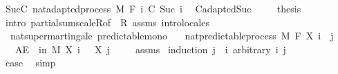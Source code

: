 \begin{isabellebody}
\ Suc{\isacharunderscore}{\kern0pt}C{\isacharcolon}{\kern0pt}\ nat{\isacharunderscore}{\kern0pt}adapted{\isacharunderscore}{\kern0pt}process\ M\ F\ {\isachardoublequoteopen}{\isasymlambda}i{\isachardot}{\kern0pt}\ C\ {\isacharparenleft}{\kern0pt}Suc\ i{\isacharparenright}{\kern0pt}{\isachardoublequoteclose}\ \isamarkupfalse%
\ C{\isachardot}{\kern0pt}adapted{\isacharunderscore}{\kern0pt}Suc\ \isacommand{{\isachardot}{\kern0pt}}\isamarkupfalse%
\isanewline
\ \ \isamarkupfalse%
\ {\isacharquery}{\kern0pt}thesis\ \isamarkupfalse%
\ {\isacharparenleft}{\kern0pt}intro\ partial{\isacharunderscore}{\kern0pt}sum{\isacharunderscore}{\kern0pt}scaleR{\isacharbrackleft}{\kern0pt}of\ {\isacharunderscore}{\kern0pt}\ R{\isacharbrackright}{\kern0pt}\ assms{\isacharparenright}{\kern0pt}\ {\isacharparenleft}{\kern0pt}intro{\isacharunderscore}{\kern0pt}locales{\isacharparenright}{\kern0pt}\isanewline
{}\isamarkupfalse%
%
\endisatagproof
{\isafoldproof}%
%
\isadelimproof
%
\endisadelimproof
%
\isadelimdocument
%
\endisadelimdocument
%
\isatagdocument
%
\isamarkuptrue%
%
\endisatagdocument
{\isafolddocument}%
%
\isadelimdocument
%
\endisadelimdocument
{}\isamarkupfalse%
\ {\isacharparenleft}{\kern0pt}\ nat{\isacharunderscore}{\kern0pt}supermartingale{\isacharparenright}{\kern0pt}\ predictable{\isacharunderscore}{\kern0pt}mono{\isacharcolon}{\kern0pt}\isanewline
\ \ \ {\isachardoublequoteopen}nat{\isacharunderscore}{\kern0pt}predictable{\isacharunderscore}{\kern0pt}process\ M\ F\ X{\isachardoublequoteclose}\ {\isachardoublequoteopen}i\ {\isasymle}\ j{\isachardoublequoteclose}\isanewline
\ \ \ {\isachardoublequoteopen}AE\ {\isasymxi}\ in\ M{\isachardot}{\kern0pt}\ X\ i\ {\isasymxi}\ {\isasymge}\ X\ j\ {\isasymxi}{\isachardoublequoteclose}\isanewline
%
\isadelimproof
\ \ %
\endisadelimproof
%
\isatagproof
{}\isamarkupfalse%
\ assms{\isacharparenleft}{\kern0pt}{}{\isacharparenright}{\kern0pt}\isanewline
{}\isamarkupfalse%
\ {\isacharparenleft}{\kern0pt}induction\ {\isachardoublequoteopen}j\ {\isacharminus}{\kern0pt}\ i{\isachardoublequoteclose}\ arbitrary{\isacharcolon}{\kern0pt}\ i\ j{\isacharparenright}{\kern0pt}\isanewline
\ \ \isamarkupfalse%
\ {}\isanewline
\ \ \isamarkupfalse%
\ \isamarkupfalse%
\ {\isacharquery}{\kern0pt}case\ \isamarkupfalse%
\ simp\ \isanewline
{}\isamarkupfalse%

\end{isabellebody}
